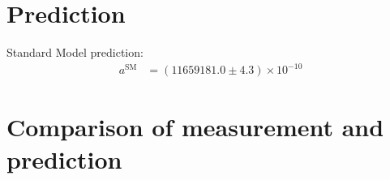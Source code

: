 \documentclass[12pt]{beamer}
\newcommand{\Exp}{\text{Exp}}
\newcommand{\SM}{\text{SM}}
\newcommand{\amuExp}{11659206.1}
\newcommand{\numamuExp}{\num{\amuExp}}
\newcommand{\DamuExp}{4.1} %
\newcommand{\amuSM}{11659181.0}
\newcommand{\numamuSM}{\num{\amuSM}}
\newcommand{\DamuSM}{4.3}
\begin{document}

\section{Prediction}

\begin{frame}{\insertsection}
  Standard Model prediction:
  \begin{align*}
    a^\SM &= (\numamuSM \pm \DamuSM)\times 10^{-10}
  \end{align*}
\end{frame}


\section{Comparison of measurement and prediction}

\end{document}
